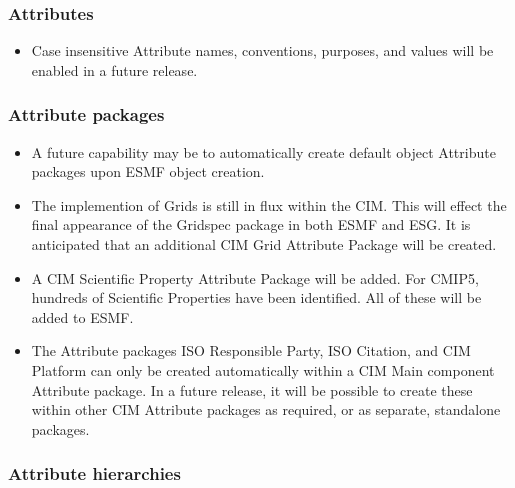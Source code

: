 %


\subsubsection{Attributes}

\begin{itemize}
\item Case insensitive Attribute names, conventions, purposes, and values will be enabled in a future release.
\end{itemize}


\subsubsection{Attribute packages}

\begin{itemize}
\item A future capability may be to automatically create default object Attribute packages upon ESMF object creation.
\item The implemention of Grids is still in flux within the CIM.  This will effect the final appearance of the Gridspec package in both ESMF and ESG. It is anticipated that an additional CIM Grid Attribute Package will be created.
\item A CIM Scientific Property Attribute Package will be added. For CMIP5, hundreds of Scientific Properties have been identified. All of these will be added to ESMF. 
\item The Attribute packages ISO Responsible Party, ISO Citation, and CIM Platform can only be created automatically within a CIM Main component Attribute package.  In a future release, it will be possible to create these within other CIM Attribute packages as required, or as separate, standalone packages.
\end{itemize}


\subsubsection{Attribute hierarchies}

